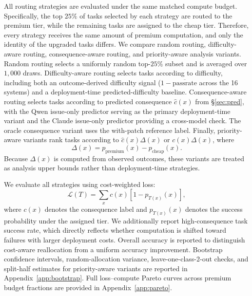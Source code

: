\documentclass{article}
\begin{document}
All routing strategies are evaluated under the same matched compute
budget. Specifically, the top $25\%$ of tasks selected by each strategy
are routed to the premium tier, while the remaining tasks are assigned
to the cheap tier. Therefore, every strategy receives the same amount
of premium computation, and only the identity of the upgraded tasks
differs. We compare random routing, difficulty-aware routing,
consequence-aware routing, and priority-aware analysis variants.
Random routing selects a uniformly random top-$25\%$ subset and is
averaged over $1{,}000$ draws. Difficulty-aware routing selects tasks
according to difficulty, including both an outcome-derived difficulty
signal
($1-\overline{\mathrm{passrate}}$ across the 16 systems) and a
deployment-time predicted-difficulty baseline. Consequence-aware
routing selects tasks according to predicted consequence
$\hat{c}(x)$ from \S\ref{sec:pred}, with the Qwen issue-only predictor
serving as the primary deployment-time variant and the Claude issue-only
predictor providing a cross-model check. The oracle consequence variant
uses the with-patch reference label. Finally, priority-aware variants
rank tasks according to
$\hat{c}(x)\Delta(x)$ or $c(x)\Delta(x)$, where
\[
\Delta(x)=p_{\mathrm{premium}}(x)-p_{\mathrm{cheap}}(x).
\]
Because $\Delta(x)$ is computed from observed outcomes, these variants
are treated as analysis upper bounds rather than deployment-time
strategies.

We evaluate all strategies using cost-weighted loss:
\[
\mathcal{L}(T)
=
\sum_x c(x)\left[1-p_{T(x)}(x)\right],
\]
where $c(x)$ denotes the consequence label and
$p_{T(x)}(x)$ denotes the success probability under the assigned tier.
We additionally report high-consequence task success rate, which
directly reflects whether computation is shifted toward failures with
larger deployment costs. Overall accuracy is reported to distinguish
cost-aware reallocation from a uniform accuracy improvement. Bootstrap
confidence intervals, random-allocation variance, leave-one-class-2-out
checks, and split-half estimates for priority-aware variants are
reported in Appendix~\ref{app:bootstrap}. Full loss--compute Pareto
curves across premium budget fractions are provided in
Appendix~\ref{app:pareto}.
\end{document}
